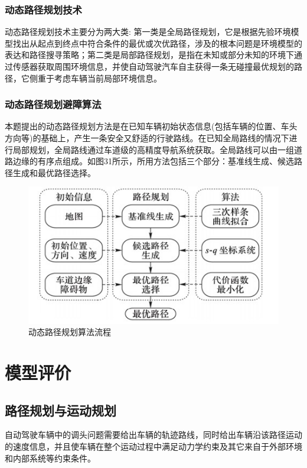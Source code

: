 \documentclass{article}
\begin{document}
\subsubsection{动态路径规划技术}
动态路径规划技术主要分为两大类: 第一类是全局路径规划，它是根据先验环境模型找出从起点到终点中符合条件的最优或次优路径，涉及的根本问题是环境模型的表达和路径搜寻策略；第二类是局部路径规划，是指在未知或部分未知的环境下通过传感器获取周围环境信息，并使自动驾驶汽车自主获得一条无碰撞最优规划的路径，它侧重于考虑车辆当前局部环境信息。\cite{王富奎2018高动态环境下智能车局部路径规划研究}

\subsubsection{动态路径规划避障算法}
本题提出的动态路径规划方法是在已知车辆初始状态信息(包括车辆的位置、车头方向等)的基础上，产生一条安全又舒适的行驶路线。在已知全局路线的情况下进行局部规划，全局路线通过车道级的高精度导航系统获取。全局路线可以由一组道路边缘的有序点组成。如图31所示，所用方法包括三个部分：基准线生成、候选路径生成和最优路径选择。

\begin{figure}[H]
    \centering
    \includegraphics[scale=0.8]{31.jpg}
    \caption{动态路径规划算法流程}
\end{figure}

\newpage
\section{模型评价}
\subsection{路径规划与运动规划}
自动驾驶车辆中的调头问题需要给出车辆的轨迹路线，同时给出车辆沿该路径运动的速度信息，并且使车辆在整个运动过程中满足动力学约束及其它来自于外部环境和内部系统等约束条件。\cite{li2017nonlinear}
\end{document}
